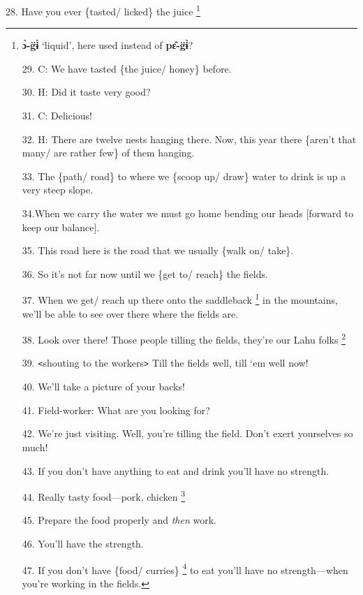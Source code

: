 28. Have you ever \{tasted/ licked\} the juice \footnote{\textbf{ɔ̀-g̈ɨ̀} `liquid', here used instead of \textbf{pɛ̂-g̈ɨ̀}?

29. C: We have tasted \{the juice/ honey\} before.

30. H: Did it taste very good?

31. C: Delicious!

32. H: There are twelve nests hanging there. Now, this year there \{aren't that
many/ are rather few\} of them hanging.

33. The \{path/ road\} to where we \{scoop up/ draw\} water to drink is up a very
steep slope.

34.When we carry the water we must go home bending our heads [forward to keep our
balance].

35. This road here is the road that we usually \{walk on/ take\}.

36. So it's not far now until we \{get to/ reach\} the fields.

37. When we get/ reach up there onto the saddleback \footnote{\textbf{qā-lèʔ}: `a relatively flat or low part of a mountain; saddleback;} in the mountains, we'll
be able to see over there where the fields are.

38. Look over there! Those people tilling the fields, they're our Lahu folks \.\footnote{\textbf{Lâhū-yâ:} lit. ``Lahu sons; Lahu children.'' cf. Heb. B'nei Yisrael.}

39. \texttt{<}shouting to the workers\texttt{>} Till the fields well, till `em
well now!

40. We'll take a picture of your backs!

41. Field-worker: What are you looking for?

42. We're just visiting. Well, you're tilling the field. Don't exert yourselves
so much!

43. If you don't have anything to eat and drink you'll have no strength.

44. Really tasty food---pork, chicken \.\footnote{H. is gently teasing them. Meat was something eaten only on special occasions,}

45. Prepare the food properly and \textit{then} work.

46. You'll have the strength.

47. If you don't have \{food/ curries\} \footnote{\textbf{ɔ̄-chî}: lit. ``rice-lifter'' (\textbf{chî }`lift up'), that which} to eat you'll have no strength---when
you're working in the fields.

}
